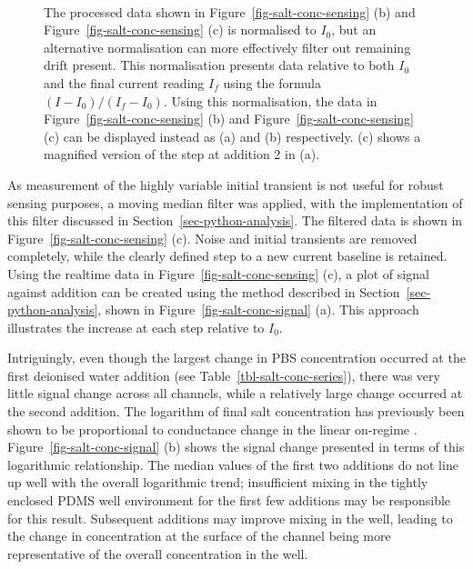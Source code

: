 \documentclass[
  a4paper,
]{scrbook}
\begin{document}
\begin{figure}
\begin{minipage}[t]{0.70\linewidth}
{{}

}

\end{minipage}%
%
\begin{minipage}[t]{0.15\linewidth}

{\centering 

~

}

\end{minipage}%

\caption{\label{fig-salt-conc-sensing-2}The processed data shown in
Figure~\ref{fig-salt-conc-sensing} (b) and
Figure~\ref{fig-salt-conc-sensing} (c) is normalised to \(I_{0}\), but
an alternative normalisation can more effectively filter out remaining
drift present. This normalisation presents data relative to both
\(I_{0}\) and the final current reading \(I_{f}\) using the formula
\((I - I_{0})/(I_{f} - I_{0})\). Using this normalisation, the data in
Figure~\ref{fig-salt-conc-sensing} (b) and
Figure~\ref{fig-salt-conc-sensing} (c) can be displayed instead as (a)
and (b) respectively. (c) shows a magnified version of the step at
addition 2 in (a).}

\end{figure}

As measurement of the highly variable initial transient is not useful
for robust sensing purposes, a moving median filter was applied, with
the implementation of this filter discussed in
Section~\ref{sec-python-analysis}. The filtered data is shown in
Figure~\ref{fig-salt-conc-sensing} (c). Noise and initial transients are
removed completely, while the clearly defined step to a new current
baseline is retained. Using the realtime data in
Figure~\ref{fig-salt-conc-sensing} (c), a plot of signal against
addition can be created using the method described in
Section~\ref{sec-python-analysis}, shown in
Figure~\ref{fig-salt-conc-signal} (a). This approach illustrates the
increase at each step relative to \(I_{0}\).

Intriguingly, even though the largest change in PBS concentration
occurred at the first deionised water addition (see
Table~\ref{tbl-salt-conc-series}), there was very little signal change
across all channels, while a relatively large change occurred at the
second addition. The logarithm of final salt concentration has
previously been shown to be proportional to conductance change in the
linear on-regime \autocite{Heller2010}.
Figure~\ref{fig-salt-conc-signal} (b) shows the signal change presented
in terms of this logarithmic relationship. The median values of the
first two additions do not line up well with the overall logarithmic
trend; insufficient mixing in the tightly enclosed PDMS well environment
for the first few additions may be responsible for this result.
Subsequent additions may improve mixing in the well, leading to the
change in concentration at the surface of the channel being more
representative of the overall concentration in the well.
\end{document}
